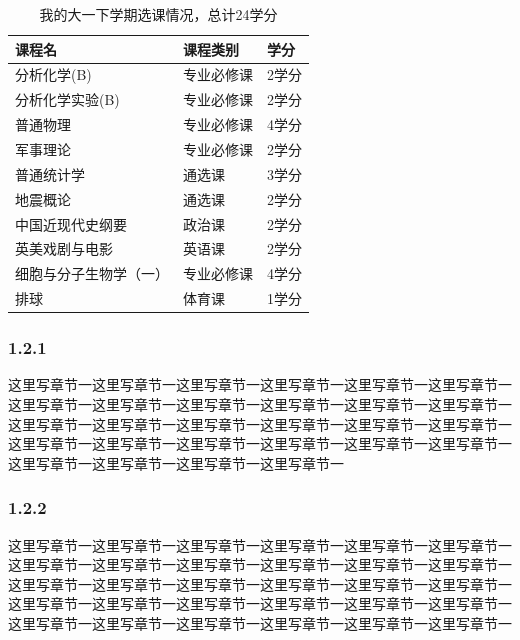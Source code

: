 \documentclass[UTF8,12pt,a4paper]{ctexart}
\begin{document}
\begin{table}[h]
	\renewcommand\arraystretch{1.2}
	\centering
	\begin{tabular}{@{}p{5cm}p{5cm}p{1.4cm}@{}}
		\toprule
		\textbf{课程名}        & \textbf{课程类别} & \textbf{学分} \\
		\midrule
		分析化学(B)            & 专业必修课    & 2学分         \\
		分析化学实验(B)        & 专业必修课    & 2学分         \\
		普通物理               & 专业必修课        & 4学分         \\
		军事理论               & 专业必修课        & 2学分         \\
		普通统计学             & 通选课            & 3学分         \\
		地震概论               & 通选课            & 2学分         \\
		中国近现代史纲要       & 政治课            & 2学分         \\
		英美戏剧与电影         & 英语课            & 2学分         \\
		细胞与分子生物学（一） & 专业必修课    & 4学分         \\
		排球                   & 体育课            & 1学分         \\ \bottomrule
	\end{tabular}
	\caption{我的大一下学期选课情况，总计24学分}
	\label{888}
\end{table}
\subsubsection{1.2.1}

这里写章节一这里写章节一这里写章节一这里写章节一这里写章节一这里写章节一这里写章节一这里写章节一这里写章节一这里写章节一这里写章节一这里写章节一这里写章节一这里写章节一这里写章节一这里写章节一这里写章节一这里写章节一这里写章节一这里写章节一这里写章节一这里写章节一这里写章节一这里写章节一这里写章节一这里写章节一这里写章节一这里写章节一

\subsubsection{1.2.2}
这里写章节一这里写章节一这里写章节一这里写章节一这里写章节一这里写章节一这里写章节一这里写章节一这里写章节一这里写章节一这里写章节一这里写章节一这里写章节一这里写章节一这里写章节一这里写章节一这里写章节一这里写章节一这里写章节一这里写章节一这里写章节一这里写章节一这里写章节一这里写章节一这里写章节一这里写章节一这里写章节一这里写章节一这里写章节一这里写章节一
\end{document}
